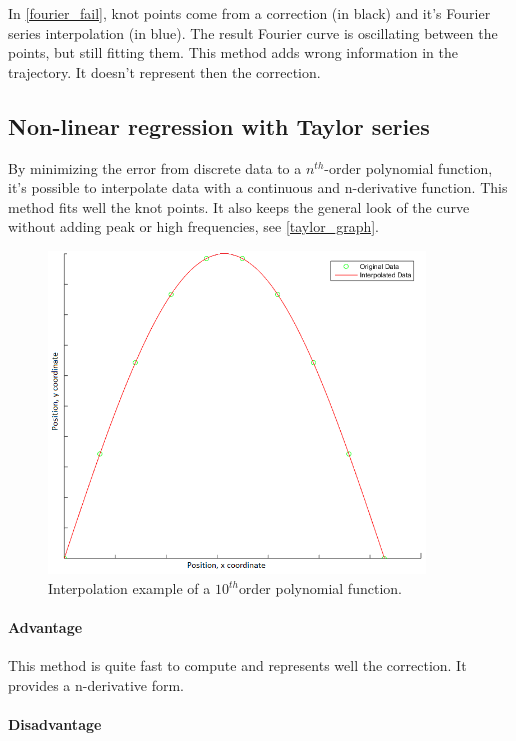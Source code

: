 In \autoref{fourier_fail}, knot points come from a correction (in black) and it's Fourier series interpolation (in blue). The result Fourier curve is oscillating between the points, but still fitting them. This method adds wrong information in the trajectory. It doesn't represent then the correction.\\

\subsection{Non-linear regression with Taylor series}

By minimizing the error from discrete data to a $n^{th}$-order polynomial function, it's possible to interpolate data with a continuous and n-derivative function. This method fits well the knot points. It also keeps the general look of the curve without adding peak or high frequencies, see \autoref{taylor_graph}.

\begin{figure}[H]
\centering
\includegraphics[width=10cm]{img/taylor.png}
\caption{Interpolation example of a $10^{th}$order polynomial function.}
\label{taylor_graph}
\end{figure}

\paragraph*{Advantage}

This method is quite fast to compute and represents well the correction. It provides a n-derivative form.

\paragraph*{Disadvantage}

